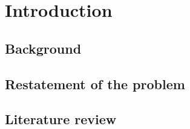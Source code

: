 \section{Introduction}
\subsection{Background}
\subsection{Restatement of the problem}
\subsection{Literature review}